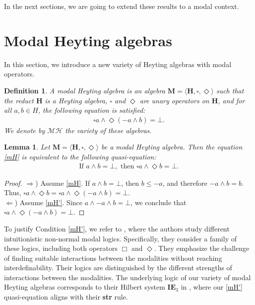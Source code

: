 \documentclass[pdflatex,sn-mathphys-num]{sn-jnl}%
\newtheorem{lemma}{Lemma}
\newcommand{\He}{\mathbf{H}}
\theoremstyle{thmstyleone}%
\theoremstyle{thmstyletwo}%
\theoremstyle{thmstylethree}%
\newtheorem{definition}{Definition}%
\begin{document}
In the next sections, we are going to extend these results to a modal context.


\section{Modal Heyting algebras}\label{sec3}

In this section, we introduce a new variety of Heyting algebras with modal operators.

\begin{definition} \label{ModalHeytingAlgebra}
A \emph{modal Heyting algebra} is an algebra $\mathbf{M} = \langle \He, \square, \Diamond \rangle$ such that the reduct $\He$ is a Heyting algebra, $\square$ and $\Diamond$ are unary operators on $\He$, and for all $a, b \in H$, the following equation is satisfied:
\begin{align}
    \square a \wedge \Diamond (-a \wedge b) = \bot. \tag{mH} \label{mH}
\end{align}
We denote by $\mathcal{MH}$ the variety of these algebras.
\end{definition}

\begin{lemma} \label{equivAxrule1}
Let $\mathbf{M} = \langle \He, \square, \Diamond \rangle$ be a modal Heyting algebra. Then the equation \eqref{mH} is equivalent to the following quasi-equation:
\begin{align}
     \text{If } a \wedge b = \bot, \text{ then } \square a \wedge \Diamond b = \bot. \tag{mH'} \label{mH'}
\end{align}
\end{lemma}

\begin{proof}
$\Rightarrow$) Assume \eqref{mH}. If $a \wedge b = \bot$, then $b \leq -a$, and therefore $-a \wedge b = b$. Thus, $\square a \wedge \Diamond b = \square a \wedge \Diamond (-a \wedge b) = \bot$. \\
$\Leftarrow$) Assume \eqref{mH'}. Since $a \wedge -a \wedge b = \bot$, we conclude that $\square a \wedge \Diamond (-a \wedge b) = \bot$.
\end{proof}

To justify Condition \eqref{mH'}, we refer to \cite{Oli2020}, where the authors study different intuitionistic non-normal modal logics. Specifically, they consider a family of these logics, including both operators $\Box$ and $\Diamond$. They emphasize the challenge of finding suitable interactions between the modalities without reaching interdefinability. Their logics are distinguished by the different strengths of interactions between the modalities. The underlying logic of our variety of modal Heyting algebras corresponds to their Hilbert system $\textbf{IE}_3$ in \cite[Section 4.2]{Oli2020}, where our \eqref{mH'} quasi-equation aligns with their {\bf str} rule.
\end{document}
